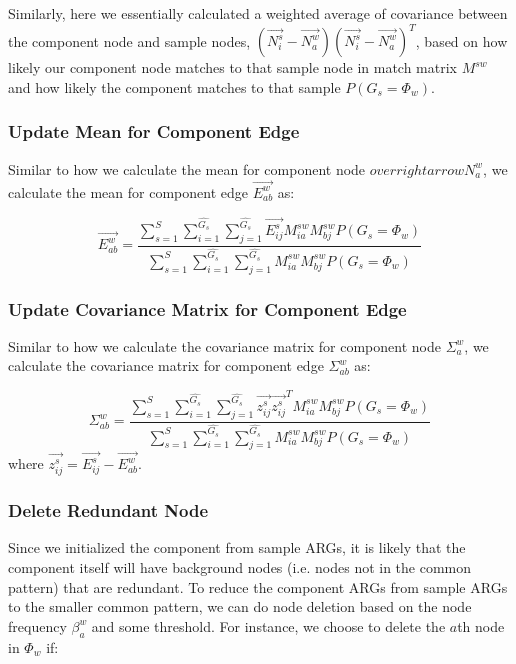 Similarly, here we essentially calculated a weighted average of covariance between the component node and sample nodes, $(\overrightarrow{N^s_i} - \overrightarrow{N^w_a})(\overrightarrow{N^s_i} - \overrightarrow{N^w_a})^T$, based on how likely our component node matches to that sample node in match matrix $M^{sw}$ and how likely the component matches to that sample $P(G_s=\Phi_w)$.\\

\subsubsection{Update Mean for Component Edge}

Similar to how we calculate the mean for component node $overrightarrow{N^w_a}$, we calculate the mean for component edge $\overrightarrow{E^w_{ab}}$ as:

\begin{equation} 
\overrightarrow{E^w_{ab}}=\frac{\sum^S_{s=1}\sum^{\widehat{G_s}}_{i=1}\sum^{\widehat{G_s}}_{j=1}\overrightarrow{E^s_{ij}}M^{sw}_{ia}M^{sw}_{bj}P(G_s=\Phi_w)}{\sum^S_{s=1}\sum^{\widehat{G_s}}_{i=1}\sum^{\widehat{G_s}}_{j=1}M^{sw}_{ia}M^{sw}_{bj}P(G_s=\Phi_w)}
\end{equation}

\subsubsection{Update Covariance Matrix for Component Edge}

Similar to how we calculate the covariance matrix for component node $\Sigma^w_a$, we calculate the covariance matrix for component edge $\Sigma^w_{ab}$ as:

\begin{equation} 
\Sigma^w_{ab}=\frac{\sum^S_{s=1}\sum^{\widehat{G_s}}_{i=1}\sum^{\widehat{G_s}}_{j=1}\overrightarrow{z^s_{ij}}\overrightarrow{z^s_{ij}}^TM^{sw}_{ia}M^{sw}_{bj}P(G_s=\Phi_w)}{\sum^S_{s=1}\sum^{\widehat{G_s}}_{i=1}\sum^{\widehat{G_s}}_{j=1}M^{sw}_{ia}M^{sw}_{bj}P(G_s=\Phi_w)}
\end{equation}
where $\overrightarrow{z^s_{ij}} = \overrightarrow{E^s_{ij}} - \overrightarrow{E^w_{ab}}$.\\

\subsubsection{Delete Redundant Node}

Since we initialized the component from sample ARGs, it is likely that the component itself will have background nodes (i.e. nodes not in the common pattern) that are redundant. To reduce the component ARGs from sample ARGs to the smaller common pattern, we can do node deletion based on the node frequency $\beta^w_a$ and some threshold. For instance, we choose to delete the $a$th node in $\Phi_w$ if:

